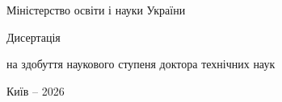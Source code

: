 \begin{titlepage}
\begin{center}
Міністерство освіти і науки України

\vspace{2cm}

{\Large Дисертація}

\vspace{1.5cm}

{\bfseries\Large \thesistitle}

\vspace{2cm}

на здобуття наукового ступеня доктора технічних наук

\vfill

Київ -- 2026
\end{center}
\end{titlepage}
